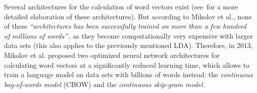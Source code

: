 Several architectures for the calculation of word vectors exist (see\,\cite{mikolov_efficient_2013,mikolov_linguistic_2013} for a more detailed elaboration of these architectures). But according to Mikolov et al., none of these \textit{``architectures has been successfully trained on more than a few hundred of millions of words''}\,\cite[p1]{mikolov_efficient_2013}, as they become computationally very expensive with larger data sets (this also applies to the previously mentioned LDA). Therefore, in 2013, Mikolov et al. proposed two optimized neural network architectures for calculating word vectors at a significantly reduced learning time, which allows to train a language model on data sets with billions of words instead: the \emph{continuous bag-of-words model} (CBOW) and the \emph{continuous skip-gram model}\,\cite{mikolov_efficient_2013}.\\
